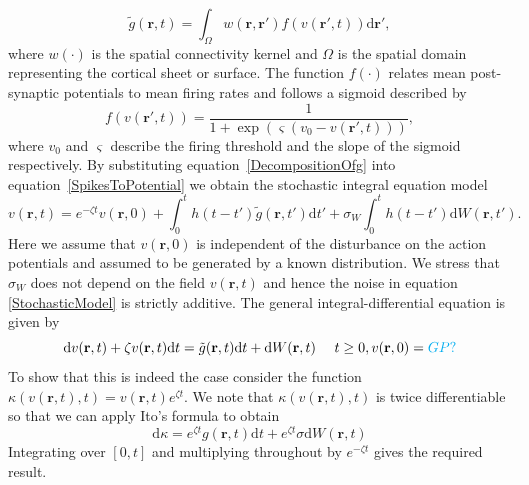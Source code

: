 \documentclass[]{article}
\newcommand{\cyan}{\textcolor{cyan}}
\begin{document}
\begin{equation}
	\label{RateBasedInteractions} \tilde{g}\left( \mathbf{r},t \right) = \int_\Omega {w\left( \mathbf{r},\mathbf{r}' \right)f\left( v\left( \mathbf{r}',t \right) \right)\textrm{d}\mathbf{r}'}, 
\end{equation}
where $w(\cdot)$ is the spatial connectivity kernel and $\Omega$ is the spatial domain representing the cortical sheet or surface. The function $f(\cdot)$ relates mean post-synaptic potentials to mean firing rates and follows a sigmoid described by
\begin{equation}
	\label{ActivationFunction} f\left( v\left( \mathbf{r}', t \right) \right) = \frac{1}{1 + \exp \left( \varsigma \left( v_0 - v\left(\mathbf{r}',t\right) \right) \right)}, 
\end{equation}
where $v_0$ and $\varsigma$ describe the firing threshold and the slope of the sigmoid respectively. 
By substituting equation~\ref{DecompositionOfg} into equation~\ref{SpikesToPotential} we obtain the stochastic integral equation model 
\begin{equation}
	\label{StochasticModel} v\left(\mathbf{r},t\right) = e^{-\zeta t}v\left( {\mathbf{r},0} \right) +
	\int_{0}^t h\left(t - t'\right)\tilde{g}\left(\mathbf{r},t'\right) \textrm{d}t'+ \sigma_W\int_{0}^t h\left(t - t'\right)\textrm{d}W\left(\mathbf{r},t'\right).
\end{equation}
 Here we assume that $v\left( {\mathbf{r}},0 \right)$ is independent of the disturbance on the action potentials and assumed to be generated by a known distribution. We stress that $\sigma_W$ does not depend on the field $v({\mathbf{r}},t)$ and hence the noise in equation \ref{StochasticModel} is strictly additive. The general integral-differential equation is given by 
\begin{equation} \label{DifferentialEquationContTime}
 \textrm{d}v(\mathbf{r},t) + \zeta v(\mathbf{r},t)\textrm{d}t = \tilde{g}(\mathbf{r},t)\textrm{d}t + \textrm{d}W(\mathbf{r},t)  ~~~~ t \ge 0, v(\mathbf{r},0) = \cyan{GP?}
\end{equation}
To show that this is indeed the case consider the function $\kappa(v(\mathbf{r},t),t) = v(\mathbf{r},t)e^{\zeta t}$. We note that $\kappa(v(\mathbf{r},t),t)$ is twice differentiable so that we can apply Ito's formula to obtain
\begin{equation}
 \textrm{d}\kappa = e^{\zeta t}g(\mathbf{r},t)\textrm{d}t + e^{\zeta t}\sigma \textrm{d}W(\mathbf{r},t)
\end{equation}
\noindent Integrating over $[0,t]$ and multiplying throughout by $e^{-\zeta t}$ gives the required result.
\end{document}
